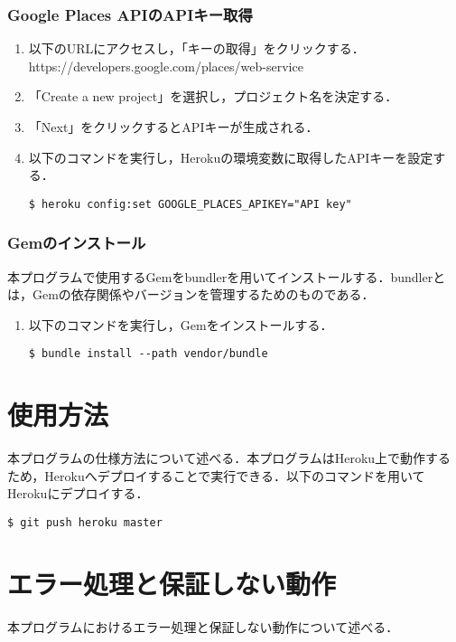 \documentclass[12pt]{jsarticle}
\begin{document}
\subsubsection{Google Places APIのAPIキー取得}
\begin{enumerate}
\item 以下のURLにアクセスし，「キーの取得」をクリックする．\\
  https://developers.google.com/places/web-service
\item 「Create a new project」を選択し，プロジェクト名を決定する．
\item 「Next」をクリックするとAPIキーが生成される．
\item 以下のコマンドを実行し，Herokuの環境変数に取得したAPIキーを設定する．
\begin{verbatim}
$ heroku config:set GOOGLE_PLACES_APIKEY="API key"
\end{verbatim}
\end{enumerate}

\subsubsection{Gemのインストール}
本プログラムで使用するGemをbundlerを用いてインストールする．bundlerとは，Gemの依存関係やバージョンを管理するためのものである．
\begin{enumerate}
\item 以下のコマンドを実行し，Gemをインストールする．
\begin{verbatim}
$ bundle install --path vendor/bundle
\end{verbatim}
\end{enumerate}

\section{使用方法}
\label{usage}
本プログラムの仕様方法について述べる．本プログラムはHeroku上で動作するため，Herokuへデプロイすることで実行できる．以下のコマンドを用いてHerokuにデプロイする．

\begin{verbatim}
$ git push heroku master
\end{verbatim}

\newpage
\section{エラー処理と保証しない動作}
\label{error_handling}
本プログラムにおけるエラー処理と保証しない動作について述べる．
\end{document}
